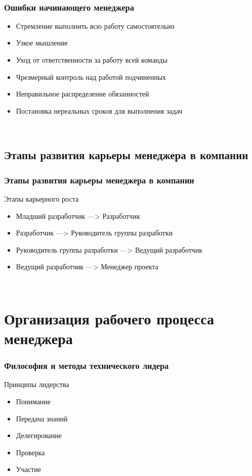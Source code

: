 \documentclass{../industrial-development}
\begin{document}
~\cite{How_to_be_a_good_IT-manager}

\begin{frame} \frametitle{Ошибки начинающего менеджера}
\begin{itemize}		
		\item Стремление выполнить всю работу самостоятельно
	 	\item Узкое мышление
	 	\item Уход от ответственности за работу всей команды
		\item Чрезмерный контроль над работой подчиненных
	 	\item Неправильное распределение обязанностей
	 	\item Постановка нереальных сроков для выполнения задач
 \end{itemize}
\end{frame}
\lecturenotes

~\cite{How_to_be_a_good_IT-manager}

\subsection{Этапы развития карьеры менеджера в компании}

\begin{frame} \frametitle{Этапы развития карьеры менеджера в компании}
 \begin{block}{Этапы карьерного роста}
\begin{itemize}
  \item Младший разработчик ---> Разработчик
  \item Разработчик ---> Руководитель группы разработки
  \item Руководитель группы разработки ---> Ведущий разработчик
  \item Ведущий разработчик ---> Менеджер проекта
  \end{itemize}
 \end{block}
\end{frame}
\lecturenotes

~\cite{How_to_be_a_good_IT-manager}

\section{Организация рабочего процесса менеджера}

\begin{frame} \frametitle{Философия и методы технического лидера}
 \begin{block}{Принципы лидерства}
\begin{itemize}
  \item Понимание
  \item Передача знаний
  \item Делегирование
  \item Проверка
  \item Участие
  \end{itemize}
 \end{block}
\end{frame}
\lecturenotes
\end{document}
